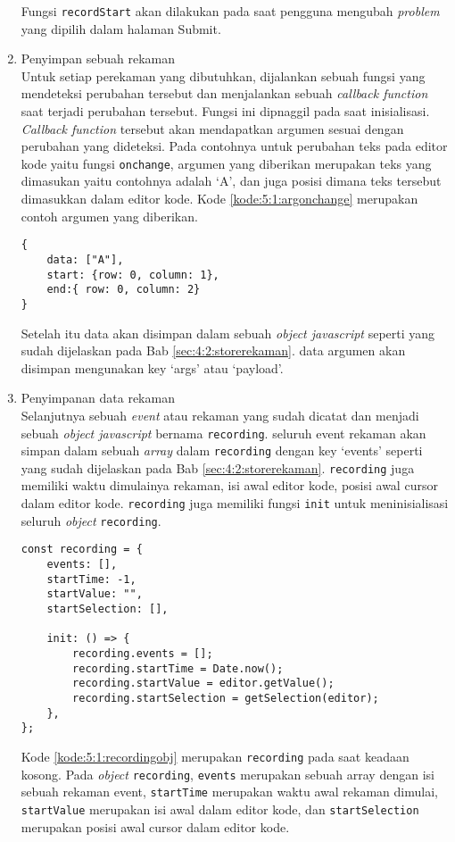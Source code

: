 \begin{enumerate}
    Fungsi \verb|recordStart| akan dilakukan pada saat pengguna mengubah \textit{problem} yang dipilih dalam halaman Submit.

    \item Penyimpan sebuah rekaman \\
    Untuk setiap perekaman yang dibutuhkan, dijalankan sebuah fungsi yang mendeteksi perubahan tersebut dan menjalankan sebuah \textit{callback function} saat terjadi perubahan tersebut. Fungsi ini dipnaggil pada saat inisialisasi. \textit{Callback function} tersebut akan mendapatkan argumen sesuai dengan perubahan yang dideteksi. Pada contohnya untuk perubahan teks pada editor kode yaitu fungsi \verb|onchange|, argumen yang diberikan merupakan teks yang dimasukan yaitu contohnya adalah `A', dan juga posisi dimana teks tersebut dimasukkan dalam editor kode. Kode \ref{kode:5:1:argonchange} merupakan contoh argumen yang diberikan.
    \begin{lstlisting}[caption={Contoh argumen yang diberikan oleh fungsi onchange}, label={kode:5:1:argonchange}]
{
    data: ["A"], 
    start: {row: 0, column: 1}, 
    end:{ row: 0, column: 2}
}
    \end{lstlisting}
    Setelah itu data akan disimpan dalam sebuah \textit{object javascript}
    seperti yang sudah dijelaskan pada Bab \ref{sec:4:2:storerekaman}. data argumen akan disimpan mengunakan key `args' atau `payload'.
    
    \item Penyimpanan data rekaman \\
    Selanjutnya sebuah \textit{event} atau rekaman yang sudah dicatat dan menjadi sebuah \textit{object javascript} bernama \verb|recording|. seluruh event rekaman akan simpan dalam sebuah \textit{array} dalam \verb|recording| dengan key `events' seperti yang sudah dijelaskan pada Bab \ref{sec:4:2:storerekaman}. \verb|recording| juga memiliki waktu dimulainya rekaman, isi awal editor kode, posisi awal cursor dalam editor kode. \verb|recording| juga memiliki fungsi \verb|init| untuk meninisialisasi seluruh \textit{object} \verb|recording|.

    \begin{lstlisting}[caption={Contoh argumen yang diberikan oleh fungsi onchange}, label={kode:5:1:recordingobj}]
const recording = {
    events: [],
    startTime: -1,
    startValue: "",
    startSelection: [],

    init: () => {
        recording.events = [];
        recording.startTime = Date.now();
        recording.startValue = editor.getValue();
        recording.startSelection = getSelection(editor);
    },
};
    \end{lstlisting}

    Kode \ref{kode:5:1:recordingobj} merupakan \verb|recording| pada saat keadaan kosong. Pada \textit{object} \verb|recording|, \verb|events| merupakan sebuah array dengan isi sebuah rekaman event, \verb|startTime| merupakan waktu awal rekaman dimulai, \verb|startValue| merupakan isi awal dalam editor kode, dan \verb|startSelection| merupakan posisi awal cursor dalam editor kode.
\end{enumerate}

